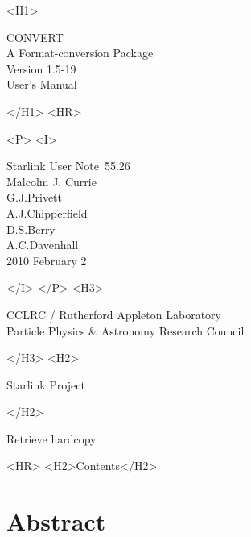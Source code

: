 \documentclass[twoside,11pt]{article}
\newcommand{\stardoccategory}  {Starlink User Note}
\newcommand{\stardocsource}    {sun\stardocnumber}
\newcommand{\stardocnumber}    {55.26}
\newcommand{\stardocauthors}   {Malcolm J. Currie\\
                                G.J.Privett\\
                                A.J.Chipperfield\\
                                D.S.Berry\\
                                A.C.Davenhall}
\newcommand{\stardocdate}      {2010 February 2}
\newcommand{\stardoctitle}     {CONVERT\\
                                A Format-conversion Package}
\newcommand{\stardocversion}   {Version 1.5-19}
\newcommand{\stardocmanual}    {User's Manual}
\newcommand{\htmladdnormallink}[2]{#1}
\newcommand{\htmladdimg}[1]{}
\newcommand{\htmlref}[2]{#1}
\newcommand{\htmladdtonavigation}[1]{}
\newcommand{\xlabel}[1]{}
\begin{document}
\begin{htmlonly}
   \xlabel{}
   \begin{rawhtml} <H1> \end{rawhtml}
      \stardoctitle\\
      \stardocversion\\
      \stardocmanual
   \begin{rawhtml} </H1> <HR> \end{rawhtml}


   \begin{rawhtml} <P> <I> \end{rawhtml}
   \stardoccategory\ \stardocnumber \\
   \stardocauthors \\
   \stardocdate
   \begin{rawhtml} </I> </P> <H3> \end{rawhtml}
      \htmladdnormallink{CCLRC / Rutherford Appleton Laboratory}
                        {http://www.cclrc.ac.uk} \\
      \htmladdnormallink{Particle Physics \& Astronomy Research Council}
                        {http://www.pparc.ac.uk} \\
   \begin{rawhtml} </H3> <H2> \end{rawhtml}
      \htmladdnormallink{Starlink Project}{http://www.starlink.rl.ac.uk/}
   \begin{rawhtml} </H2> \end{rawhtml}
   \htmladdnormallink{\htmladdimg{source.gif} Retrieve hardcopy}
      {http://www.starlink.rl.ac.uk/cgi-bin/hcserver?\stardocsource}\\

  \label{stardoccontents}
  \begin{rawhtml} 
    <HR>
    <H2>Contents</H2>
  \end{rawhtml}
  \htmladdtonavigation{\htmlref{\htmladdimg{contents_motif.gif}}
        {stardoccontents}}

  \section{\xlabel{abstract}Abstract}
\end{htmlonly}
\end{document}
